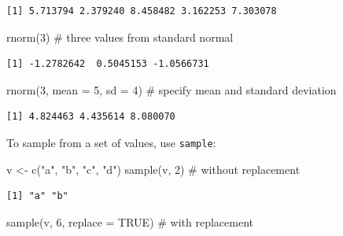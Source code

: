 \documentclass[
  letterpaper,
  DIV=11,
  numbers=noendperiod]{scrreprt}
\newenvironment{Shaded}{\begin{snugshade}}{\end{snugshade}}
\newcommand{\AttributeTok}[1]{\textcolor[rgb]{0.40,0.45,0.13}{#1}}
\newcommand{\CommentTok}[1]{\textcolor[rgb]{0.37,0.37,0.37}{#1}}
\newcommand{\ConstantTok}[1]{\textcolor[rgb]{0.56,0.35,0.01}{#1}}
\newcommand{\DecValTok}[1]{\textcolor[rgb]{0.68,0.00,0.00}{#1}}
\newcommand{\FunctionTok}[1]{\textcolor[rgb]{0.28,0.35,0.67}{#1}}
\newcommand{\NormalTok}[1]{\textcolor[rgb]{0.00,0.23,0.31}{#1}}
\newcommand{\OtherTok}[1]{\textcolor[rgb]{0.00,0.23,0.31}{#1}}
\newcommand{\StringTok}[1]{\textcolor[rgb]{0.13,0.47,0.30}{#1}}
\begin{document}
\begin{verbatim}
[1] 5.713794 2.379240 8.458482 3.162253 7.303078
\end{verbatim}

\begin{Shaded}
\begin{Highlighting}[]
\FunctionTok{rnorm}\NormalTok{(}\DecValTok{3}\NormalTok{) }\CommentTok{\# three values from standard normal}
\end{Highlighting}
\end{Shaded}

\begin{verbatim}
[1] -1.2782642  0.5045153 -1.0566731
\end{verbatim}

\begin{Shaded}
\begin{Highlighting}[]
\FunctionTok{rnorm}\NormalTok{(}\DecValTok{3}\NormalTok{, }\AttributeTok{mean =} \DecValTok{5}\NormalTok{, }\AttributeTok{sd =} \DecValTok{4}\NormalTok{) }\CommentTok{\# specify mean and standard deviation}
\end{Highlighting}
\end{Shaded}

\begin{verbatim}
[1] 4.824463 4.435614 8.080070
\end{verbatim}

To sample from a set of values, use \texttt{sample}:

\begin{Shaded}
\begin{Highlighting}[]
\NormalTok{v }\OtherTok{\textless{}{-}} \FunctionTok{c}\NormalTok{(}\StringTok{"a"}\NormalTok{, }\StringTok{"b"}\NormalTok{, }\StringTok{"c"}\NormalTok{, }\StringTok{"d"}\NormalTok{)}
\FunctionTok{sample}\NormalTok{(v, }\DecValTok{2}\NormalTok{) }\CommentTok{\# without replacement}
\end{Highlighting}
\end{Shaded}

\begin{verbatim}
[1] "a" "b"
\end{verbatim}

\begin{Shaded}
\begin{Highlighting}[]
\FunctionTok{sample}\NormalTok{(v, }\DecValTok{6}\NormalTok{, }\AttributeTok{replace =} \ConstantTok{TRUE}\NormalTok{) }\CommentTok{\# with replacement}
\end{Highlighting}
\end{Shaded}
\end{document}
